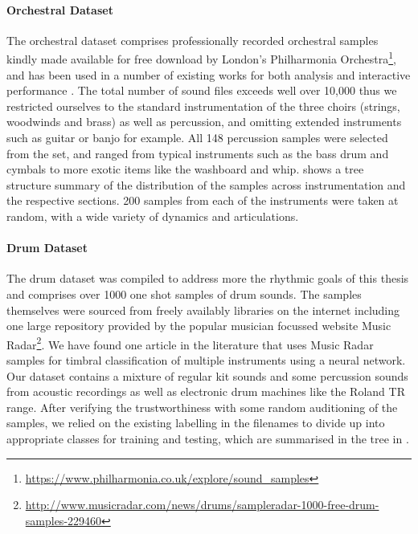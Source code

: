 {{{{\paragraph{Orchestral Dataset}



The orchestral dataset comprises professionally recorded orchestral samples kindly made available for free download by London's Philharmonia Orchestra\footnote{\url{https://www.philharmonia.co.uk/explore/sound_samples}}, and has been used in a number of existing works for both analysis \citep{Hulshof2016, Donnelly2016, Pishdadian2017} and interactive performance \citep{Miller2010}. The total number of sound files exceeds well over 10,000 thus we restricted ourselves to the standard instrumentation of the three choirs (strings, woodwinds and brass) as well as percussion, and omitting extended instruments such as guitar or banjo for example. All 148 percussion samples were selected from the set, and ranged from typical instruments such as the bass drum and cymbals to more exotic items like the washboard and whip.  shows a tree structure summary of the distribution of the samples across instrumentation and the respective sections. 200 samples from each of the instruments were taken at random, with a wide variety of dynamics and articulations.

\paragraph{Drum Dataset}

The drum dataset was compiled to address more the rhythmic goals of this thesis and comprises over 1000 one shot samples of drum sounds. The samples themselves were sourced from freely availably libraries on the internet including one large repository provided by the popular musician focussed website Music Radar\footnote{\url{http://www.musicradar.com/news/drums/sampleradar-1000-free-drum-samples-229460}}. We have found one article in the literature \citep{Masood2015} that uses Music Radar samples for timbral classification of multiple instruments using a neural network. Our dataset contains a mixture of regular kit sounds and some percussion sounds from acoustic recordings as well as electronic drum machines like the Roland TR range. After verifying the trustworthiness with some random auditioning of the samples, we relied on the existing labelling in the filenames to divide up into appropriate classes for training and testing, which are summarised in the tree in .


}}}}

